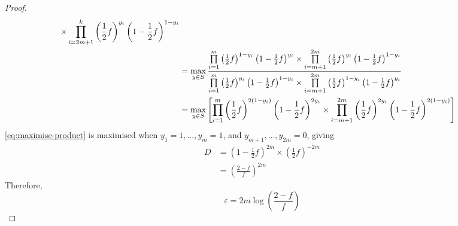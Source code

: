 \documentclass{article}
\begin{document}
\begin{proof}
\begin{align}
{				\times\prod\limits_{i=2m+1}^{k}\left(\frac{1}{2}f\right)^{y_i}\left(1-\frac{1}{2}f\right)^{1-y_i}
			}\\
			&=\max_{y\in S}\frac{%
				\prod\limits_{i=1}^m \left(\frac{1}{2}f\right)^{1-y_i}\left(1-\frac{1}{2}f\right)^{y_i}%
				\times \prod\limits_{i=m+1}^{2m}\left(\frac{1}{2}f\right)^{y_i} \left(1-\frac{1}{2}f\right)^{1-y_i}%
			}{%
				\prod\limits_{i=1}^m \left(\frac{1}{2}f\right)^{y_i}\left(1-\frac{1}{2}f\right)^{1-y_i}%
				\times \prod\limits_{i=m+1}^{2m}\left(\frac{1}{2}f\right)^{1-y_i} \left(1-\frac{1}{2}f\right)^{y_i}%
			}\\ \label{eq:maximise-product}
			&=\max_{y\in S}\left[%
				\prod\limits_{i=1}^m \left(\frac{1}{2}f\right)^{2(1-y_i)}\left(1-\frac{1}{2}f\right)^{2y_i}%
				\times \prod\limits_{i=m+1}^{2m}\left(\frac{1}{2}f\right)^{2y_i} \left(1-\frac{1}{2}f\right)^{2(1-y_i)}\right]%
	\end{align}
	\ref{eq:maximise-product} is maximised when $y_1=1,...,y_m=1$, and $y_{m+1},...,y_{2m}=0$, giving
	\begin{align}
		D &= \left(1-\frac{1}{2}f\right)^{2m}\times\left(\frac{1}{2}f\right)^{-2m}\\
			&= \left(\frac{2-f}{f}\right)^{2m}
	\end{align}
	Therefore,
	\begin{equation}
		\varepsilon = 2m\log\left(\frac{2-f}{f}\right)
	\end{equation}
\end{proof}



\end{document}
